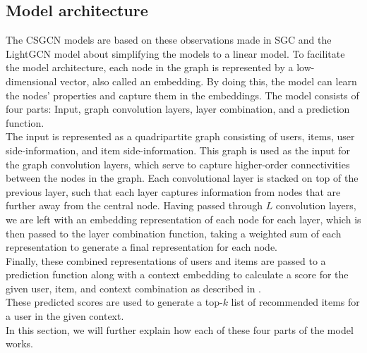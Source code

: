 \subsection{Model architecture}\label{subsec:csgcn_is_model_architecture}
The CSGCN models are based on these observations made in SGC \cite{SimplifyingGCN} and the LightGCN model \cite{LightGCN} about simplifying the models to a linear model.
To facilitate the model architecture, each node in the graph is represented by a low-dimensional vector, also called an embedding.
By doing this, the model can learn the nodes' properties and capture them in the embeddings.
The model consists of four parts: Input, graph convolution layers, layer combination, and a prediction function.\\
The input is represented as a quadripartite graph consisting of users, items, user side-information, and item side-information.
This graph is used as the input for the graph convolution layers, which serve to capture higher-order connectivities between the nodes in the graph.
Each convolutional layer is stacked on top of the previous layer, such that each layer captures information from nodes that are further away from the central node.
Having passed through $L$ convolution layers, we are left with an embedding representation of each node for each layer, which is then passed to the layer combination function, taking a weighted sum of each representation to generate a final representation for each node.\\
Finally, these combined representations of users and items are passed to a prediction function along with a context embedding to calculate a score for the given user, item, and context combination as described in .\\
These predicted scores are used to generate a top-$k$ list of recommended items for a user in the given context.\\
In this section, we will further explain how each of these four parts of the model works.




